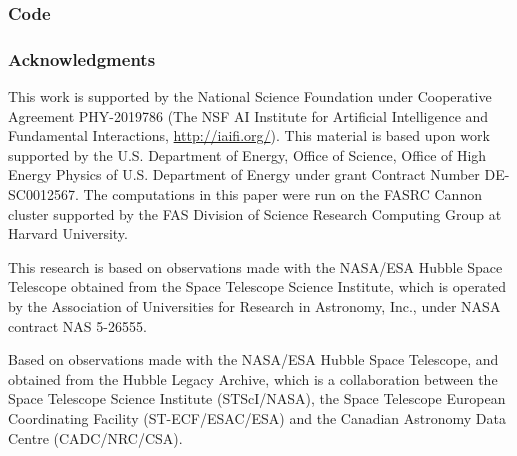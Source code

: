 \documentclass[10pt]{article} %
\begin{document}



\subsubsection*{Code}


\subsubsection*{Acknowledgments}
This work is supported by the National Science Foundation under Cooperative Agreement PHY-2019786 (The NSF AI Institute for Artificial Intelligence and Fundamental Interactions, \url{http://iaifi.org/}). This material is based upon work supported by the U.S. Department of Energy, Office of Science, Office of High Energy Physics of U.S. Department of Energy under grant Contract Number  DE-SC0012567. The computations in this paper were run on the FASRC Cannon cluster supported by the FAS Division of Science Research Computing Group at Harvard University.

This research is based on observations made with the NASA/ESA Hubble Space Telescope obtained from the Space Telescope Science Institute, which is operated by the Association of Universities for Research in Astronomy, Inc., under NASA contract NAS 5-26555.

Based on observations made with the NASA/ESA Hubble Space Telescope, and obtained from the Hubble Legacy Archive, which is a collaboration between the Space Telescope Science Institute (STScI/NASA), the Space Telescope European Coordinating Facility (ST-ECF/ESAC/ESA) and the Canadian Astronomy Data Centre (CADC/NRC/CSA).
\end{document}
